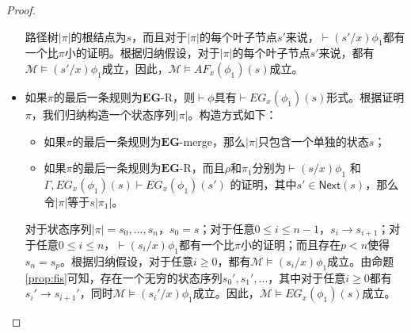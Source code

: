 \begin{proof}
\begin{itemize}
		路径树$|\pi|$的根结点为$s$，而且对于$|\pi|$的每个叶子节点$s'$来说，$\vdash (s'/x)\phi_1$都有一个比$\pi$小的证明。根据归纳假设，对于$|\pi|$的每个叶子节点$s'$来说，都有$\mathcal{M}\models (s'/x)\phi_1$成立，因此，$\mathcal{M}\models AF_x(\phi_1)(s)$成立。
		
		
		
		\item 如果$\pi$的最后一条规则为$\mathbf{EG}$-\textsf{R}，则$\vdash \phi$具有$\vdash EG_x(\phi_1)(s)$形式。根据证明$\pi$，我们归纳构造一个状态序列$|\pi|$。构造方式如下：
		\begin{itemize}
			
			\item 如果$\pi$的最后一条规则为$\mathbf{EG}$-merge，那么$|\pi|$只包含一个单独的状态$s$；
			
			
			\item 如果$\pi$的最后一条规则为$\mathbf{EG}$-\textsf{R}，而且$\rho$和$\pi_1$分别为$\vdash(s/x)\phi_1$ 和 $\Gamma,EG_x(\phi_1)(s)\vdash EG_x(\phi_1)(s')$ 的证明，其中$s'\in\mathsf{Next}(s)$，那么令$|\pi|$等于$s|\pi_1|$。
		\end{itemize}
		
		对于状态序列$|\pi|=s_0,...,s_n$，$s_0=s$；对于任意$0\le i\le n-1$，$s_i\longrightarrow s_{i+1}$；对于任意$0\le i\le n$，$\vdash(s_i/x)\phi_1$都有一个比$\pi$小的证明；而且存在$p<n$使得$s_n=s_p$。根据归纳假设，对于任意$i\ge 0$，都有$\mathcal{M}\models (s_i/x)\phi_1$成立。由命题\ref{prop:fis}可知，存在一个无穷的状态序列$s_0',s_1',...$，其中对于任意$i\ge 0$都有$s_i'\longrightarrow s_{i+1}'$，同时$\mathcal{M}\models (s_i'/x)\phi_1$成立。因此，$\mathcal{M}\models EG_x(\phi_1)(s)$成立。
		

\end{itemize}
\end{proof}
